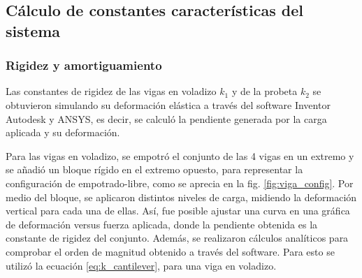 \subsection{Cálculo de constantes características del sistema}
 
\subsubsection{Rigidez y amortiguamiento} Las constantes de rigidez de las vigas en voladizo $k_1$ y de la probeta $k_2$ se obtuvieron simulando su deformación elástica a través del software Inventor Autodesk y ANSYS, es decir, se calculó la pendiente generada por la carga aplicada y su deformación. 

Para las vigas en voladizo, se empotró el conjunto de las 4 vigas en un extremo y se añadió un bloque rígido en el extremo opuesto, para representar la configuración de empotrado-libre, como se aprecia en la fig. \ref{fig:viga_config}. Por medio del bloque, se aplicaron distintos niveles de carga, midiendo la deformación vertical para cada una de ellas. Así, fue posible ajustar una curva en una gráfica de deformación versus fuerza aplicada, donde la pendiente obtenida es la constante de rigidez del conjunto. Además, se realizaron cálculos analíticos para comprobar el orden de magnitud obtenido a través del software. Para esto se utilizó la ecuación \ref{eq:k_cantilever}, para una viga en voladizo.

